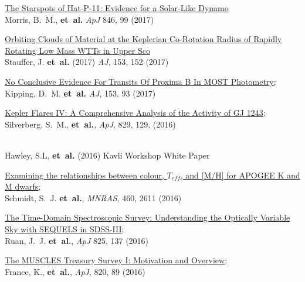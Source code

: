 \documentclass{article}
\begin{document}
\begin{llist}
\begin{etaremune}[leftmargin=10pt]
\item{\sc \href{https://arxiv.org/abs/1708.02583}{\color{NavyBlue}The Starspots of Hat-P-11: Evidence for a Solar-Like Dynamo}} \\ Morris, B.~M., {\bf et~al.} {\em ApJ} 846, 99 (2017)

\item{\sc \href{https://arxiv.org/abs/1702.01797}{\color{NavyBlue}Orbiting Clouds of Material at the Keplerian Co-Rotation Radius of Rapidly Rotating Low Mass WTTs in Upper Sco}} \\
Stauffer, J. {\bf et~al.} (2017) {\em AJ}, 153, 152 (2017)

\item{\sc \href{http://arxiv.org/abs/1609.08718}{\color{NavyBlue}No Conclusive Evidence For Transits Of Proxima B In MOST Photometry;}} \\  Kipping, D.~M. {\bf et~al.} {\em AJ}, 153, 93 (2017)

\item{\sc \href{http://arxiv.org/abs/1607.03886}{\color{NavyBlue}Kepler Flares IV: A Comprehensive Analysis of the Activity of GJ 1243}};\\ Silverberg, S.~M., {\bf et~al.}, {\em ApJ}, 829, 129, (2016)

\item{\sc\href{http://arxiv.org/abs/1607.04302}{\color{NavyBlue}{\sc Maximizing Science in the Era of LSST, Stars Study Group Report: Rotation and \\Magnetic Activity in the Galactic Field Population and in Open Star Clusters}}}\\
Hawley, S.L, {\bf et~al.} (2016) Kavli Workshop White Paper

\item{\sc \href{http://adsabs.harvard.edu/abs/2016MNRAS.460.2611S}{\color{NavyBlue}Examining the relationships between colour, $T_{eff}$, and [M/H] for APOGEE K and M dwarfs}};\\ Schmidt, S.~J. {\bf et~al.}, {\em MNRAS}, 460, 2611 (2016)

\item{\sc \href{http://arxiv.org/abs/1602.02752}{\color{NavyBlue}The Time-Domain Spectroscopic Survey: Understanding the Optically Variable Sky with SEQUELS in SDSS-III}};\\ Ruan, J.~J. {\bf et~al.}, {\em ApJ} 825, 137 (2016)

\item{\sc \href{http://adsabs.harvard.edu/abs/2016ApJ...820...89F}{\color{NavyBlue}The MUSCLES Treasury Survey I: Motivation and Overview}};\\ France, K., {\bf et~al.}, {\em ApJ}, 820, 89 (2016)


\end{etaremune}
\end{llist}
\end{document}
